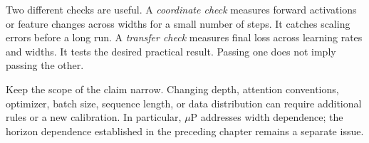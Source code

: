 
Two different checks are useful. A \emph{coordinate check} measures forward activations or feature changes across widths for a small number of steps. It catches scaling errors before a long run. A \emph{transfer check} measures final loss across learning rates and widths. It tests the desired practical result. Passing one does not imply passing the other.

Keep the scope of the claim narrow. Changing depth, attention conventions, optimizer, batch size, sequence length, or data distribution can require additional rules or a new calibration. In particular, $\mu$P addresses width dependence; the horizon dependence established in the preceding chapter remains a separate issue.

\FloatBarrier
